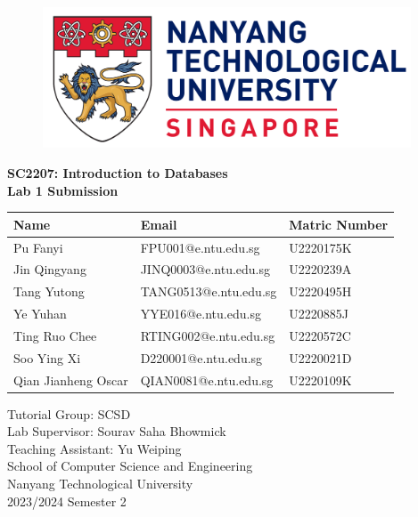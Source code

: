 \begin{titlepage}
	\begin{figure}[!t]
		\centering
		\includegraphics[width = 4.3in]{title/logo.pdf}
		\caption*{}
	\end{figure}
	
	\centering
	\LARGE{\textbf{SC2207: Introduction to Databases}}\\[0.2in]
	\LARGE{\textbf{Lab 1 Submission}}\\[1.5in]
	

	\begin{table}[h]
		\centering
		\begin{tabular}{lll}
			\toprule
			\textbf{Name} & \textbf{Email} & \textbf{Matric Number} \\
			\midrule
			Pu Fanyi & FPU001@e.ntu.edu.sg & U2220175K \\
			Jin Qingyang & JINQ0003@e.ntu.edu.sg & U2220239A \\
			Tang Yutong & TANG0513@e.ntu.edu.sg & U2220495H \\
			Ye Yuhan & YYE016@e.ntu.edu.sg & U2220885J \\
			Ting Ruo Chee & RTING002@e.ntu.edu.sg & U2220572C \\
			Soo Ying Xi & D220001@e.ntu.edu.sg & U2220021D \\
			Qian Jianheng Oscar & QIAN0081@e.ntu.edu.sg & U2220109K \\
			\bottomrule
		\end{tabular}
	\end{table}

	\large{Tutorial Group: SCSD}\\
	\large{Lab Supervisor: Sourav Saha Bhowmick}\\
	\large{Teaching Assistant: Yu Weiping}\\[0.5in]
	
	
	\Large{School of Computer Science and Engineering}\\
	\Large{Nanyang Technological University}\\[0.3in]
	
	
	\Large{2023/2024 Semester 2}
	\newpage
\end{titlepage}